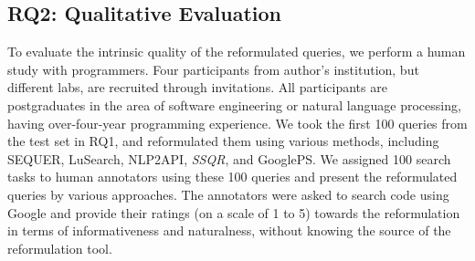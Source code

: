 \documentclass[sigconf,screen]{acmart}
\newcommand{\ourmethod}{\textit{SSQR}\xspace}
\newcommand{\gu}[1]{\textcolor{blue}{[gu: #1]}}
\newcommand{\wan}[1]{\textcolor{cyan!70!blue}{[Wan: #1]}}
\begin{document}


\subsection{RQ2: Qualitative Evaluation}

To evaluate the intrinsic quality of the reformulated queries, we perform a human study with programmers. Four participants from author's institution, but different labs, are recruited through invitations. All participants are postgraduates in the area of software engineering or natural language processing, having over-four-year programming experience. %
We took the first 100 queries from the test set in RQ1, 
and reformulated them using various methods, including SEQUER, LuSearch, NLP2API, \ourmethod, and GooglePS. We assigned 100 search tasks to human annotators using these 100 queries and present the reformulated queries by various approaches. The annotators were asked to search code using Google and provide their ratings (on a scale of 1 to 5) towards the reformulation in terms of informativeness and naturalness, without knowing the source of the reformulation tool. 
\end{document}
